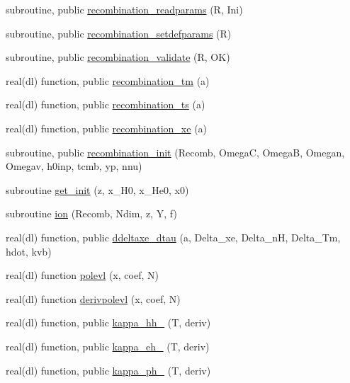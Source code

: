 \begin{DoxyCompactItemize}
\item 
subroutine, public \mbox{\hyperlink{namespacerecombination_a30d82e415adca06a256aae1be85e72a1}{recombination\+\_\+readparams}} (R, Ini)
\item 
subroutine, public \mbox{\hyperlink{namespacerecombination_aafff8339a994ad18b5b4187d9d4faa40}{recombination\+\_\+setdefparams}} (R)
\item 
subroutine, public \mbox{\hyperlink{namespacerecombination_aaaea2371b700336e16f08b64b6dd44d9}{recombination\+\_\+validate}} (R, OK)
\item 
real(dl) function, public \mbox{\hyperlink{namespacerecombination_a8d7b99ebe97a13f83da41d8d9b8215e2}{recombination\+\_\+tm}} (a)
\item 
real(dl) function, public \mbox{\hyperlink{namespacerecombination_ae89b19e4ef4ab84e9724ee4a4d2435fc}{recombination\+\_\+ts}} (a)
\item 
real(dl) function, public \mbox{\hyperlink{namespacerecombination_a64de24be26a98919cba0095322731263}{recombination\+\_\+xe}} (a)
\item 
subroutine, public \mbox{\hyperlink{namespacerecombination_ac2325c42e3b77187a31f6810929de147}{recombination\+\_\+init}} (Recomb, OmegaC, OmegaB, Omegan, Omegav, h0inp, tcmb, yp, nnu)
\item 
subroutine \mbox{\hyperlink{namespacerecombination_a7c190d70dfd56d14181b4ae8535dcd4d}{get\+\_\+init}} (z, x\+\_\+\+H0, x\+\_\+\+He0, x0)
\item 
subroutine \mbox{\hyperlink{namespacerecombination_a5f644f40f1384d3dd16e675369854f63}{ion}} (Recomb, Ndim, z, Y, f)
\item 
real(dl) function, public \mbox{\hyperlink{namespacerecombination_a7445052618f5f8ed0d793a58eb66c768}{ddeltaxe\+\_\+dtau}} (a, Delta\+\_\+xe, Delta\+\_\+nH, Delta\+\_\+\+Tm, hdot, kvb)
\item 
real(dl) function \mbox{\hyperlink{namespacerecombination_abd7e507e301ec237a76ea22d6a6be0eb}{polevl}} (x, coef, N)
\item 
real(dl) function \mbox{\hyperlink{namespacerecombination_aae74849488f7c602dd70b57a9e9782f2}{derivpolevl}} (x, coef, N)
\item 
real(dl) function, public \mbox{\hyperlink{namespacerecombination_a6456c5ea7f228fa74eba8e54de9eded5}{kappa\+\_\+hh\+\_\+21cm}} (T, deriv)
\item 
real(dl) function, public \mbox{\hyperlink{namespacerecombination_ad379abd3309c2fd3f5cacb8b614b80a5}{kappa\+\_\+eh\+\_\+21cm}} (T, deriv)
\item 
real(dl) function, public \mbox{\hyperlink{namespacerecombination_a27e7c8f022215a5bb27a45d2b5db20bb}{kappa\+\_\+ph\+\_\+21cm}} (T, deriv)
\end{DoxyCompactItemize}
